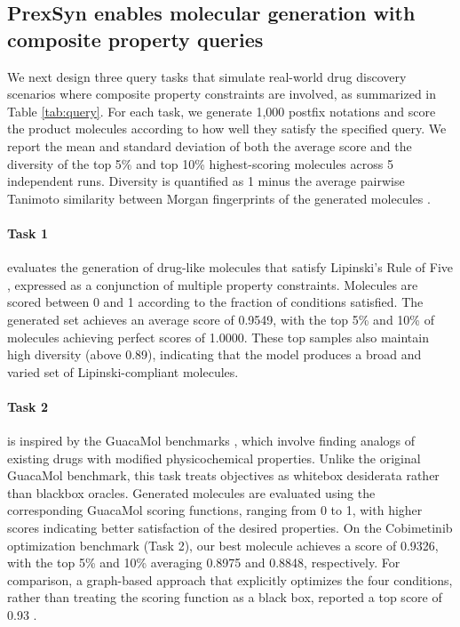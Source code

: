 \subsection{PrexSyn enables molecular generation with composite property queries}

We next design three query tasks that simulate real-world drug discovery scenarios where composite property constraints are involved, as summarized in Table \ref{tab:query}.
For each task, we generate 1,000 postfix notations and score the product molecules according to how well they satisfy the specified query.
We report the mean and standard deviation of both the average score and the diversity of the top 5\% and top 10\% highest-scoring molecules across 5 independent runs.
Diversity is quantified as 1 minus the average pairwise Tanimoto similarity between Morgan fingerprints of the generated molecules \citep{jin2020multi}.

\paragraph{Task 1} evaluates the generation of drug-like molecules that satisfy Lipinski's Rule of Five \citep{lipinski2004lead,chagas2018drug}, expressed as a conjunction of multiple property constraints.
Molecules are scored between 0 and 1 according to the fraction of conditions satisfied.
The generated set achieves an average score of 0.9549, with the top 5\% and 10\% of molecules achieving perfect scores of 1.0000.
These top samples also maintain high diversity (above 0.89), indicating that the model produces a broad and varied set of Lipinski-compliant molecules.

\paragraph{Task 2} is inspired by the GuacaMol benchmarks \citep{brown2019guacamol}, which involve finding analogs of existing drugs with modified physicochemical properties.
Unlike the original GuacaMol benchmark, this task treats objectives as whitebox desiderata rather than blackbox oracles. 
Generated molecules are evaluated using the corresponding GuacaMol scoring functions, ranging from 0 to 1, with higher scores indicating better satisfaction of the desired properties.
On the Cobimetinib optimization benchmark (Task 2), our best molecule achieves a score of 0.9326, with the top 5\% and 10\% averaging 0.8975 and 0.8848, respectively.
For comparison, a graph-based approach that explicitly optimizes the four conditions, rather than treating the scoring function as a black box, reported a top score of 0.93 \citep{verhellen2022graph}.

